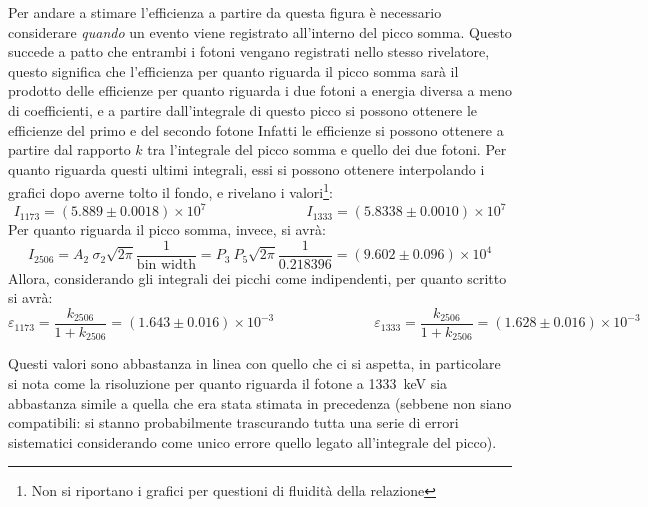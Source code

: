 Per andare a stimare l'efficienza a partire da questa figura è necessario considerare \textit{quando} un evento viene registrato all'interno del picco somma. Questo succede
a patto che entrambi i fotoni vengano registrati nello stesso rivelatore, questo significa che l'efficienza per quanto riguarda il picco somma sarà il prodotto delle efficienze
per quanto riguarda i due fotoni a energia diversa a meno di coefficienti, e a partire dall'integrale di questo picco si possono ottenere le efficienze del primo e del secondo fotone Infatti le
efficienze si possono ottenere a partire dal rapporto $k$ tra l'integrale del picco somma e quello dei due fotoni. Per quanto riguarda questi ultimi integrali, essi si possono ottenere
interpolando i grafici dopo averne tolto il fondo, e rivelano i valori\footnote{Non si riportano i grafici per questioni di fluidità della relazione}:
$$I_{1173} = (5.889 \pm 0.0018)\times 10^7 \hspace{3cm} I_{1333} = (5.8338 \pm 0.0010)\times 10^7$$
Per quanto riguarda il picco somma, invece, si avrà:
$$I_{2506} = A_2\ \sigma_2\sqrt{2\pi}\frac{1}{\text{bin width}} = P_3\ P_5 \sqrt{2\pi}\frac{1}{0.218396} = (9.602 \pm 0.096)\times 10^4$$
Allora, considerando gli integrali dei picchi come indipendenti, per quanto scritto si avrà:
$$\varepsilon_{1173}=\frac{k_{2506}}{1+k_{2506}}=(1.643 \pm 0.016)\times 10^{-3} \hspace{3cm} \varepsilon_{1333}=\frac{k_{2506}}{1+k_{2506}}=(1.628 \pm 0.016)\times 10^{-3}$$

Questi valori sono abbastanza in linea con quello che ci si aspetta, in particolare si nota come la risoluzione per quanto riguarda il fotone a 1333~keV sia abbastanza
simile a quella che era stata stimata in precedenza (sebbene non siano compatibili: si stanno probabilmente trascurando tutta una serie di errori sistematici considerando
come unico errore quello legato all'integrale del picco).\\

